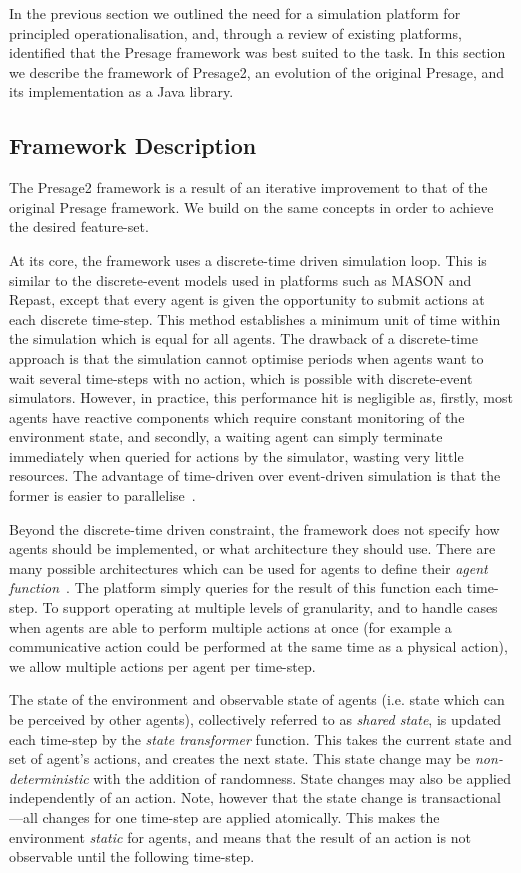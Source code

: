 In the previous section we outlined the need for a simulation platform for
principled operationalisation, and, through a review of existing platforms,
identified that the Presage framework was best suited to the task. In this
section we describe the framework of Presage2, an evolution of the original
Presage, and its implementation as a Java library.

\subsection{Framework Description}

The Presage2 framework is a result of an iterative improvement to that of the
original Presage framework. We build on the same concepts in order to achieve
the desired feature-set.

At its core, the framework uses a discrete-time driven simulation loop. This
is similar to the discrete-event models used in platforms such as MASON and
Repast, except that every agent is given the opportunity to submit actions at
each discrete time-step. This method establishes a minimum unit of time within
the simulation which is equal for all agents. The drawback of a discrete-time
approach is that the simulation cannot optimise periods when agents want to
wait several time-steps with no action, which is possible with discrete-event
simulators. However, in practice, this performance hit is negligible as,
firstly, most agents have reactive components which require constant
monitoring of the environment state, and secondly, a waiting agent can simply
terminate immediately when queried for actions by the simulator, wasting very
little resources. The advantage of time-driven over event-driven simulation is
that the former is easier to parallelise~\citep{Ferscha1995}.

Beyond the discrete-time driven constraint, the framework does not specify how
agents should be implemented, or what architecture they should use. There are
many possible architectures which can be used for agents to define their
\emph{agent function}~\citep{Rao1995,Kakas:2004bh}. The platform simply
queries for the result of this function each time-step. To support operating
at multiple levels of granularity, and to handle cases when agents are able to
perform multiple actions at once (for example a communicative action could be
performed at the same time as a physical action), we allow multiple actions
per agent per time-step.

The state of the environment and observable state of agents (i.e. state which
can be perceived by other agents), collectively referred to as \emph{shared
state}, is updated each time-step by the \emph{state transformer} function.
This takes the current state and set of agent's actions, and creates the next
state. This state change may be \emph{non-deterministic} with the addition of
randomness. State changes may also be applied independently of an action.
Note, however that the state change is transactional---all changes for one
time-step are applied atomically. This makes the environment \emph{static} for
agents, and means that the result of an action is not observable until the
following time-step.

